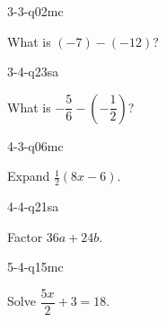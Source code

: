 \begin{practiceQuestion}{3-3-q02}{mc}
\begin{questionText}
What is $(-7) - (-12)$?
\end{questionText}
\end{practiceQuestion}

\begin{practiceQuestion}{3-4-q23}{sa}
\begin{questionText}
What is $-\dfrac{5}{6} - \left(-\dfrac{1}{2}\right)$?
\end{questionText}
\end{practiceQuestion}

\begin{practiceQuestion}{4-3-q06}{mc}
\begin{questionText}
Expand $\frac{1}{2}(8x - 6)$.


\end{questionText}
\end{practiceQuestion}

\begin{practiceQuestion}{4-4-q21}{sa}
\begin{questionText}
Factor $36a + 24b$.
\end{questionText}
\end{practiceQuestion}

\begin{practiceQuestion}{5-4-q15}{mc}
\begin{questionText}
Solve $\dfrac{5x}{2} + 3 = 18$.
\end{questionText}
\end{practiceQuestion}

